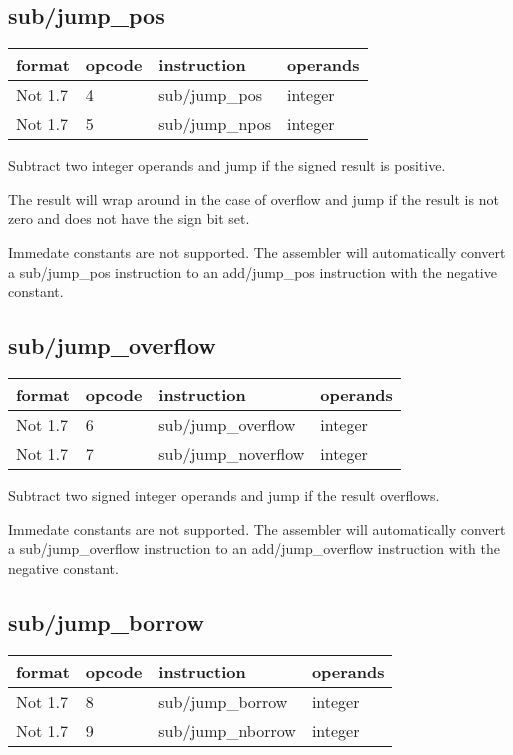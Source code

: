 \documentclass[forwardcom.tex]{subfiles}
\begin{document}
\subsection{sub/jump\_pos}
\label{table:subJumpPosInstruction}
\begin{tabular}{|p{20mm}|p{12mm}|p{56mm}|p{50mm}|}
\hline
\bfseries format & \bfseries opcode & \bfseries instruction & \bfseries operands \\ \hline
Not 1.7 &  4 & sub/jump\_pos & integer \\ \hline
Not 1.7 &  5 & sub/jump\_npos & integer\\ \hline
\end{tabular}
\vv

Subtract two integer operands and jump if the signed result is positive.

The result will wrap around in the case of overflow and jump if the result is not zero and does not have the sign bit set.
\vv

Immedate constants are not supported. The assembler will automatically convert a sub/jump\_pos instruction to an add/jump\_pos instruction with the negative constant.
\vv

\subsection{sub/jump\_overflow}
\label{table:subJumpOverflInstruction}
\begin{tabular}{|p{20mm}|p{12mm}|p{56mm}|p{50mm}|}
\hline
\bfseries format & \bfseries opcode & \bfseries instruction & \bfseries operands \\ \hline
Not 1.7 &  6 & sub/jump\_overflow & integer \\ \hline
Not 1.7 &  7 & sub/jump\_noverflow & integer\\ \hline
\end{tabular}
\vv

Subtract two signed integer operands and jump if the result overflows.
\vv

Immedate constants are not supported. The assembler will automatically convert a sub/jump\_overflow instruction to an add/jump\_overflow instruction with the negative constant.
\vv

\subsection{sub/jump\_borrow}
\label{table:subJumpBorrowInstruction}
\begin{tabular}{|p{20mm}|p{12mm}|p{56mm}|p{50mm}|}
\hline
\bfseries format & \bfseries opcode & \bfseries instruction & \bfseries operands \\ \hline
Not 1.7 &  8 & sub/jump\_borrow & integer \\ \hline
Not 1.7 &  9 & sub/jump\_nborrow & integer\\ \hline
\end{tabular}
\vv
\end{document}
